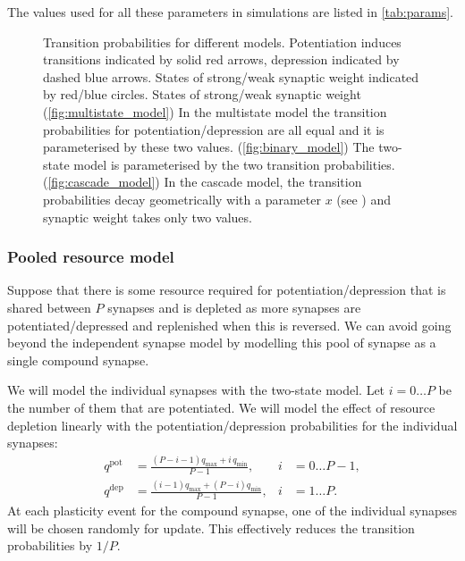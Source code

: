 \documentclass[12pt]{article}
\newcommand{\pot}{^{\text{pot}}}
\newcommand{\dep}{^{\text{dep}}}
\newcommand{\lmax}{_{\text{max}}}
\newcommand{\lmin}{_{\text{min}}}
\begin{document}
The values used for all these parameters in simulations are listed in \autoref{tab:params}.

\begin{figure}
 \begin{center}
 \begin{myenuma}
  \item{}\label{fig:multistate_model}\hspace{0.5cm}
  \item{}\label{fig:binary_model}\hspace{0.5cm}
  \item{}\label{fig:cascade_model}
 \end{myenuma}
 \end{center}
  \caption[Transition probabilities for different models]{Transition probabilities for different models.
  Potentiation induces transitions indicated by solid red arrows, depression indicated by dashed blue arrows.
  States of strong/weak synaptic weight indicated by red/blue circles.
  States of strong/weak synaptic weight
  (\ref{fig:multistate_model}) In the multistate model the transition probabilities for potentiation/depression are all equal and it is parameterised by these two values.
  (\ref{fig:binary_model}) The two-state model is parameterised by the two transition probabilities.
  (\ref{fig:cascade_model}) In the cascade model, the transition probabilities decay geometrically with a parameter $x$ (see \cite{Fusi2005cascade}) and synaptic weight takes only two values.
  } \label{fig:models}
\end{figure}

\subsubsection{Pooled resource model}\label{sec:pooledmodel}

Suppose that there is some resource required for potentiation/depression that is shared between $P$ synapses and is depleted as more synapses are potentiated/depressed and replenished when this is reversed.
We can avoid going beyond the independent synapse model by modelling this pool of synapse as a single compound synapse.

We will model the individual synapses with the two-state model.
Let $i=0\ldots P$ be the number of them that are potentiated.
We will model the effect of resource depletion linearly with the potentiation/depression probabilities for the individual synapses:
%
\begin{equation}\label{eq:depletion}
  \begin{aligned}
    q\pot &= \frac{(P-i-1)q\lmax + i\,q\lmin}{P-1}, \quad& i &= 0 \ldots P-1,\\
    q\dep &= \frac{(i-1)q\lmax + (P-i)q\lmin}{P-1}, & i &= 1 \ldots P.
  \end{aligned}
\end{equation}
%
At each plasticity event for the compound synapse, one of the individual synapses will be chosen randomly for update.
This effectively reduces the transition probabilities by $1/P$.
\end{document}
